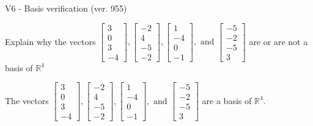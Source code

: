 \begin{exercise}
  \begin{exerciseTitle}V6 - Basis verification (ver. 955)\end{exerciseTitle}
  \begin{exerciseStatement}
    Explain why the vectors \(\left[\begin{array}{r}
3 \\
0 \\
3 \\
-4
\end{array}\right] , \left[\begin{array}{r}
-2 \\
4 \\
-5 \\
-2
\end{array}\right] , \left[\begin{array}{r}
1 \\
-4 \\
0 \\
-1
\end{array}\right] , \text{ and } \left[\begin{array}{r}
-5 \\
-2 \\
-5 \\
3
\end{array}\right]\) are or are not a basis of \(\mathbb{R}^4\)	


  \end{exerciseStatement}
  \begin{exerciseAnswer}
   The vectors \(\left[\begin{array}{r}
3 \\
0 \\
3 \\
-4
\end{array}\right] , \left[\begin{array}{r}
-2 \\
4 \\
-5 \\
-2
\end{array}\right] , \left[\begin{array}{r}
1 \\
-4 \\
0 \\
-1
\end{array}\right] , \text{ and } \left[\begin{array}{r}
-5 \\
-2 \\
-5 \\
3
\end{array}\right]\) 
  	 are  a basis of \(\mathbb{R}^4\).
  


  \end{exerciseAnswer}
\end{exercise}